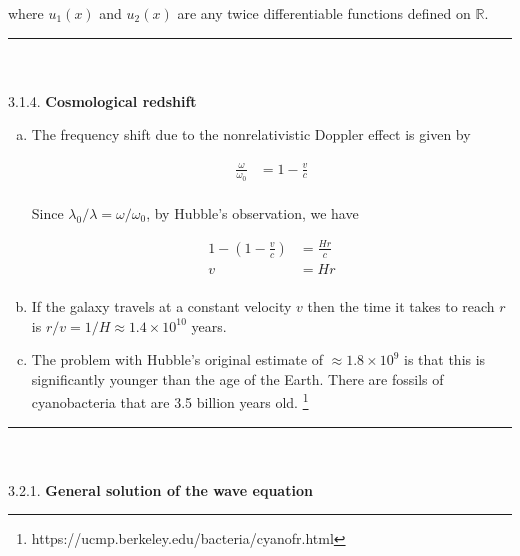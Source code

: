 \documentclass[]{article}
\begin{document}
where $u_1(x)$ and $u_2(x)$ are any twice differentiable functions defined on $\mathbb{R}$. \\ 

\noindent\rule{15cm}{0.4pt} \\
\hfill \\

3.1.4. {\bf Cosmological redshift} \\

\begin{enumerate}[a)]

\item 

The frequency shift due to the nonrelativistic Doppler effect is given by 

\begin{equation}
\begin{split}
\frac{\omega}{\omega_0} & = 1 - \frac{v}{c}\\
\end{split}
\end{equation}

Since $\lambda_0/\lambda = \omega/\omega_0$, by Hubble's observation, we have

\begin{equation}
\begin{split}
1 - \left(1 - \frac{v}{c} \right) & = \frac{Hr}{c}\\
v & = Hr \\
\end{split}
\end{equation}

\item If the galaxy travels at a constant velocity $v$ then the time it takes to reach $r$ is  $r/v = 1/H \approx 1.4 \times 10^{10}$ years.  \\

\item The problem with Hubble's original estimate of $\approx 1.8\times 10^9$ is that this is significantly younger than the age of the Earth. There are fossils of cyanobacteria that are 3.5 billion years old. \footnote{ https://ucmp.berkeley.edu/bacteria/cyanofr.html }

\end{enumerate}

\noindent\rule{15cm}{0.4pt} \\
\hfill \\

3.2.1. {\bf General solution of the wave equation} \\
\end{document}
